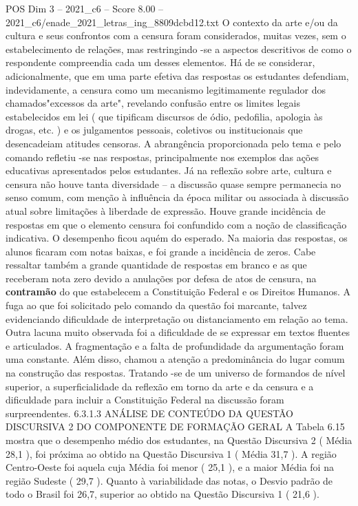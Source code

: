\begin{textsample}{POS Dim 3 – 2021\_c6 – Score 8.00 – 2021\_c6/enade\_2021\_letras\_ing\_8809dcbd12.txt}
O contexto da arte e/ou da cultura e seus confrontos com a censura foram considerados, muitas vezes, sem o estabelecimento de relações, mas restringindo -se a aspectos descritivos de como o respondente compreendia cada um desses elementos.
Há de se considerar, adicionalmente, que em uma parte efetiva das respostas os estudantes defendiam, indevidamente, a censura como um mecanismo legitimamente regulador dos chamados"excessos da arte", revelando confusão entre os limites legais estabelecidos em lei ( que tipificam discursos de ódio, pedofilia, apologia às drogas, etc. ) e os julgamentos pessoais, coletivos ou institucionais que desencadeiam atitudes censoras.
A abrangência proporcionada pelo tema e pelo comando refletiu -se nas respostas, principalmente nos exemplos das ações educativas apresentados pelos estudantes.
Já na reflexão sobre arte, cultura e censura não houve tanta diversidade – a discussão quase sempre permanecia no senso comum, com menção à influência da época militar ou associada à discussão atual sobre limitações à liberdade de expressão.
Houve grande incidência de respostas em que o elemento censura foi confundido com a noção de classificação indicativa.
O desempenho ficou aquém do esperado.
Na maioria das respostas, os alunos ficaram com notas baixas, e foi grande a incidência de zeros.
Cabe ressaltar também a grande quantidade de respostas em branco e as que receberam nota zero devido a anulações por defesa de atos de censura, na \textbf{contramão} do que estabelecem a Constituição Federal e os Direitos Humanos.
A fuga ao que foi solicitado pelo comando da questão foi marcante, talvez evidenciando dificuldade de interpretação ou distanciamento em relação ao tema.
Outra lacuna muito observada foi a dificuldade de se expressar em textos fluentes e articulados.
A fragmentação e a falta de profundidade da argumentação foram uma constante.
Além disso, chamou a atenção a predominância do lugar comum na construção das respostas.
Tratando -se de um universo de formandos de nível superior, a superficialidade da reflexão em torno da arte e da censura e a dificuldade para incluir a Constituição Federal na discussão foram surpreendentes. 6.3.1.3 ANÁLISE DE CONTEÚDO DA QUESTÃO DISCURSIVA 2 DO COMPONENTE DE FORMAÇÃO GERAL A Tabela 6.15 mostra que o desempenho médio dos estudantes, na Questão Discursiva 2 ( Média 28,1 ), foi próxima ao obtido na Questão Discursiva 1 ( Média 31,7 ).
A região Centro-Oeste foi aquela cuja Média foi menor ( 25,1 ), e a maior Média foi na região Sudeste ( 29,7 ).
Quanto à variabilidade das notas, o Desvio padrão de todo o Brasil foi 26,7, superior ao obtido na Questão Discursiva 1 ( 21,6 ).

\end{textsample}
